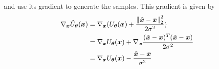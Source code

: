 and use its gradient to generate the samples. This gradient is given by
\[
\begin{aligned}
	\nabla_{\bm{x}} \tilde{U}_{\bm{\theta}} (\bm{x}) 
	&= \nabla_{\bm{x}} (U_{\bm{\theta}} (\bm{x}) + \frac{ \left\lVert\tilde{\bm{x}} - \bm{x}\right\rVert_{2}^2 }{ 2 \sigma^2 }) \\
	&= \nabla_{\bm{x}} U_{\bm{\theta}} (\bm{x}) + \nabla_{\bm{x}} \frac{ (\tilde{\bm{x}} - \bm{x})^T (\tilde{\bm{x}} - \bm{x}) }{ 2 \sigma^2 } \\
	&= \nabla_{\bm{x}} U_{\bm{\theta}} (\bm{x}) - \frac{ \tilde{\bm{x}} - \bm{x} }{ \sigma^2 } \\
\end{aligned}
\]


\begin{comment}
\subsection{Normal Approximation to Conditional}

The previous discussion revolved around making the model distribution easier to sample from by essentially convolving the data with a Gaussian 
and then sampling from the conditional. 
This conditional is less multimodal and the hope is that the Markov chain samplers converge to the target faster and allow to create representative samples with less iterations.

However, when the perturbation variance $\sigma$ is sufficiently small, 
one can obtain samples more directly by sampling from a normal approximation to the conditional.
When we do a first-order Tailor approximation to the conditional energy functional at $\tilde{\bm{x}}$ we get

\[
\begin{aligned}
	\tilde{U}_{\bm{\theta}} (\bm{x}) 
	&\doteq \tilde{U}_{\bm{\theta}} (\tilde{\bm{x}}) + (\bm{x} - \tilde{\bm{x}})^T  \nabla_{\bm{x}} \tilde{U}_{\bm{\theta}} (\tilde{\bm{x}}) 
		+ \mathcal{O}(\norm{\bm{x} - \tilde{\bm{x}}}^2) \\
	&= U_{\bm{\theta}} (\tilde{\bm{x}}) + \frac{ (\tilde{\bm{x}} - \tilde{\bm{x}})^T (\tilde{\bm{x}} - \tilde{\bm{x}}) }{ 2 \sigma^2 }
		+ (\bm{x} - \tilde{\bm{x}})^T (\nabla_{\bm{x}} U_{\bm{\theta}} (\tilde{\bm{x}}) - \frac{ \tilde{\bm{x}} - \tilde{\bm{x}} }{ \sigma^2 }) 
		+ \mathcal{O}(\norm{\bm{x} - \tilde{\bm{x}}}^2)\\
	&= U_{\bm{\theta}} (\tilde{\bm{x}}) + (\bm{x} - \tilde{\bm{x}})^T \nabla_{\bm{x}} U_{\bm{\theta}} (\tilde{\bm{x}}) + \mathcal{O}(\norm{\bm{x} - \tilde{\bm{x}}}^2)\\
\end{aligned}
\]



\[
\begin{aligned}
	\tilde{U}_{\bm{\theta}} (\bm{x}) 
	&= U_{\bm{\theta}} (\bm{x}) + \frac{ \norm{\tilde{\bm{x}} - \bm{x}}^2 }{ 2 \sigma^2 }) \\
	&\doteq U_{\bm{\theta}} (\tilde{\bm{x}}) + \frac{ (\tilde{\bm{x}} - \tilde{\bm{x}})^T (\tilde{\bm{x}} - \tilde{\bm{x}}) }{ 2 \sigma^2 } 
		+ \nabla_{\bm{x}} \\
\end{aligned}
\]
\end{comment}
